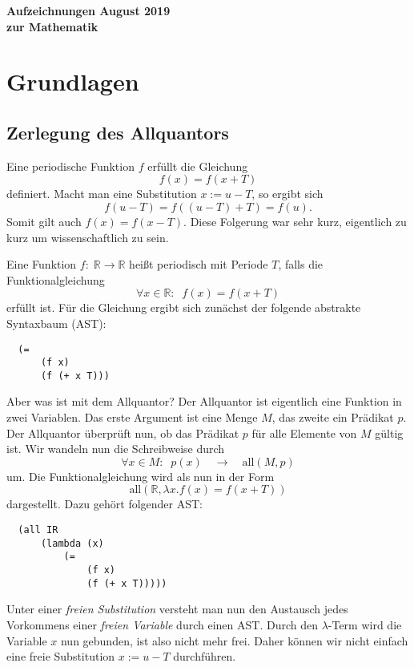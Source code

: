 \documentclass[a4paper,10pt,fleqn,twocolumn,twoside]{scrartcl}
\numberwithin{equation}{section}
\theoremstyle{rmbox}
\begin{document}
\noindent
{\LARGE\sffamily\bfseries Aufzeichnungen
{\mdseries\rmfamily\large\hfill August 2019}\\[-2pt]
zur Mathematik\par}


\tableofcontents

\section{Grundlagen}
\subsection{Zerlegung des Allquantors}
Eine periodische Funktion $f$ erfüllt die Gleichung
\begin{equation}
f(x) = f(x+T)
\end{equation}
definiert. Macht man eine Substitution $x:=u-T$, so ergibt sich
\begin{equation}
f(u-T) = f((u-T)+T) = f(u).
\end{equation}
Somit gilt auch $f(x)=f(x-T)$. Diese Folgerung war sehr kurz,
eigentlich zu kurz um wissenschaftlich zu sein.

Eine Funktion $f{:}\;\mathbb R\rightarrow\mathbb R$
heißt periodisch mit Periode $T$, falls die
Funktionalgleichung
\begin{equation}
\forall x{\in}\mathbb R{:}\;\; f(x) = f(x+T)
\end{equation}
erfüllt ist. Für die Gleichung ergibt sich zunächst
der folgende abstrakte Syntaxbaum (AST):
\begin{verbatim}
  (=
      (f x)
      (f (+ x T)))
\end{verbatim}
Aber was ist mit dem Allquantor? Der Allquantor ist eigentlich
eine Funktion in zwei Variablen. Das erste Argument ist eine Menge $M$,
das zweite ein Prädikat $p$. Der Allquantor überprüft nun, ob das
Prädikat $p$ für alle Elemente von $M$ gültig ist. Wir wandeln nun
die Schreibweise durch
\begin{equation}
\forall x{\in}M{:}\;\; p(x)\quad\longrightarrow\quad
\mathrm{all}(M,p)
\end{equation}
um. Die Funktionalgleichung wird als nun in der Form
\begin{equation}\label{periodisch-all}
\mathrm{all}(\mathbb R,\lambda x. f(x) = f(x+T))
\end{equation}
dargestellt. Dazu gehört folgender AST:
\begin{verbatim}
  (all IR
      (lambda (x)
          (=
              (f x)
              (f (+ x T)))))
\end{verbatim}
Unter einer \textit{freien Substitution} versteht man nun den
Austausch jedes Vorkommens einer \textit{freien Variable}
durch einen AST. Durch den $\lambda$-Term wird die
Variable $x$ nun gebunden, ist also nicht mehr frei.
Daher können wir nicht einfach eine freie Substitution
$x{:=}u{-}T$ durchführen.
\end{document}
